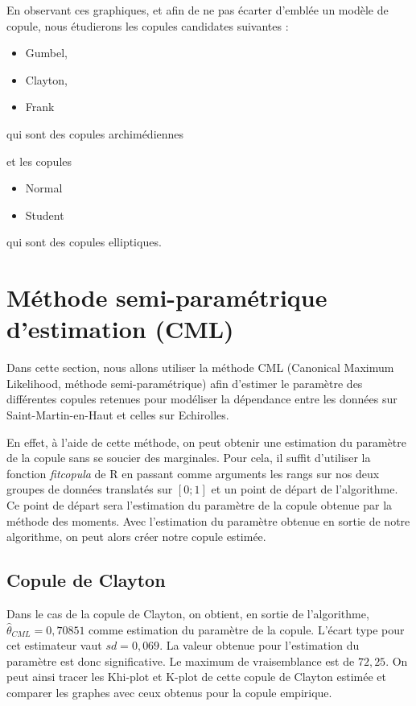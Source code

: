 En observant ces graphiques, et afin de ne pas écarter d'emblée un modèle de copule, nous étudierons les copules candidates suivantes :
\begin{itemize}
\item Gumbel,
\item Clayton,
\item Frank 
\end{itemize}
qui sont des copules archimédiennes 

et les copules
\begin{itemize} 
\item Normal
\item Student
\end{itemize}
qui sont des copules elliptiques.





\section{Méthode semi-paramétrique d'estimation (CML)}

Dans cette section, nous allons utiliser la méthode CML (Canonical Maximum Likelihood, méthode semi-paramétrique) afin d'estimer le paramètre des différentes copules retenues pour modéliser la dépendance entre les données sur Saint-Martin-en-Haut et celles sur Echirolles.

En effet, à l'aide de cette méthode, on peut obtenir une estimation du paramètre de la copule sans se soucier des marginales. Pour cela, il suffit d'utiliser la fonction \textit{fitcopula} de R en passant comme arguments les rangs sur nos deux groupes de données translatés sur $[0;1]$ et un point de départ de l'algorithme. Ce point de départ sera l'estimation du paramètre de la copule obtenue par la méthode des moments. Avec l'estimation du paramètre obtenue en sortie de notre algorithme, on peut alors créer notre copule estimée.

\subsection{Copule de Clayton}

Dans le cas de la copule de Clayton, on obtient, en sortie de l'algorithme, $\widehat{\theta}_{CML}=0,70851$ comme estimation du paramètre de la copule. L'écart type pour cet estimateur vaut $sd = 0,069$. La valeur obtenue pour l'estimation du paramètre est donc significative. Le maximum de vraisemblance est de $72,25$. 
On peut ainsi tracer les Khi-plot et K-plot de cette copule de Clayton estimée et comparer les graphes avec ceux obtenus pour la copule empirique.

